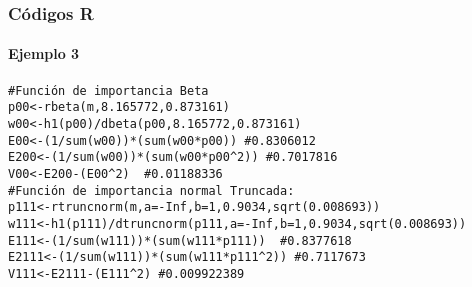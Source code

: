 \documentclass[12pt]{beamer}
\begin{document}
\begin{frame}[fragile]
\frametitle{Códigos R}
\framesubtitle{Ejemplo 3}
\begin{verbatim}
#Función de importancia Beta
p00<-rbeta(m,8.165772,0.873161)
w00<-h1(p00)/dbeta(p00,8.165772,0.873161)
E00<-(1/sum(w00))*(sum(w00*p00)) #0.8306012
E200<-(1/sum(w00))*(sum(w00*p00^2)) #0.7017816
V00<-E200-(E00^2)  #0.01188336
#Función de importancia normal Truncada:
p111<-rtruncnorm(m,a=-Inf,b=1,0.9034,sqrt(0.008693))
w111<-h1(p111)/dtruncnorm(p111,a=-Inf,b=1,0.9034,sqrt(0.008693))
E111<-(1/sum(w111))*(sum(w111*p111))  #0.8377618
E2111<-(1/sum(w111))*(sum(w111*p111^2)) #0.7117673
V111<-E2111-(E111^2) #0.009922389
\end{verbatim}
\end{frame}
\end{document}
